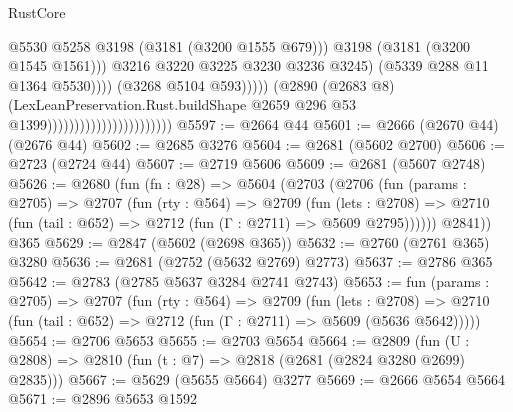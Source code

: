\begin{lexlean}{RustCore}
\begin{coremodule}
                                                                  @5530
                                                                  @5258
                                                                  @3198
                                                                  (@3181 (@3200 @1555 @679)))
                                                                @3198
                                                                (@3181 (@3200 @1545 @1561)))
                                                              @3216
                                                              @3220
                                                              @3225
                                                              @3230
                                                              @3236
                                                              @3245)
                                                            (@5339 @288 @11 @1364 @5530))))
                                                      (@3268 @5104 @593)))))
                                              (@2890
                                                (@2683 @8)
                                                (LexLeanPreservation.Rust.buildShape
                                                  @2659
                                                  @296
                                                  @53
                                                  @1399)))))))))))))))))))))))
@5597 := @2664 @44
@5601 := @2666 (@2670 @44) (@2676 @44)
@5602 := @2685 @3276
@5604 := @2681 (@5602 @2700)
@5606 := @2723 (@2724 @44)
@5607 := @2719 @5606
@5609 := @2681 (@5607 @2748)
@5626 := @2680
    (fun (fn : @28) =>
    @5604
      (@2703
        (@2706
          (fun (params : @2705) =>
          @2707
            (fun (rty : @564) =>
            @2709
              (fun (lets : @2708) =>
              @2710 (fun (tail : @652) => @2712 (fun (Γ : @2711) => @5609 @2795))))))
        @2841))
    @365
@5629 := @2847 (@5602 (@2698 @365))
@5632 := @2760 (@2761 @365) @3280
@5636 := @2681 (@2752 (@5632 @2769) @2773)
@5637 := @2786 @365
@5642 := @2783 (@2785 @5637 @3284 @2741 @2743)
@5653 := fun (params : @2705) =>
  @2707
    (fun (rty : @564) =>
    @2709
      (fun (lets : @2708) =>
      @2710 (fun (tail : @652) => @2712 (fun (Γ : @2711) => @5609 (@5636 @5642)))))
@5654 := @2706 @5653
@5655 := @2703 @5654
@5664 := @2809 (fun (U : @2808) => @2810 (fun (t : @7) => @2818 (@2681 (@2824 @3280 @2699) @2835)))
@5667 := @5629 (@5655 @5664) @3277
@5669 := @2666 @5654 @5664
@5671 := @2896 @5653 @1592

\end{coremodule}
\end{lexlean}
